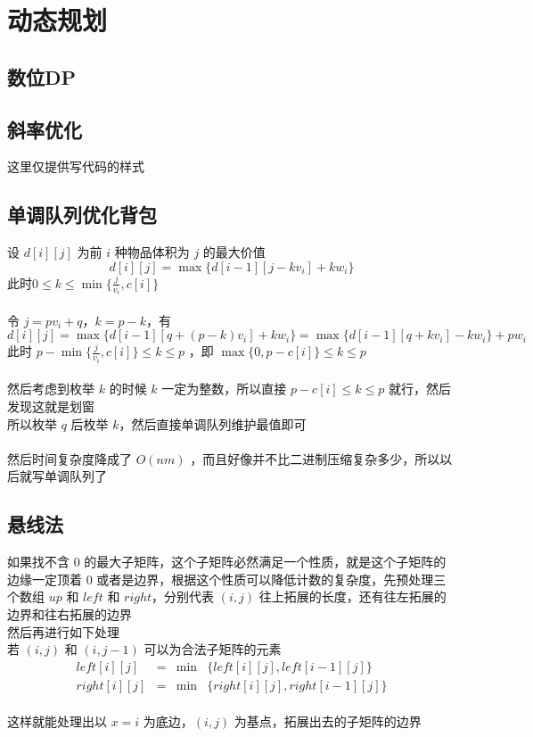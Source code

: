 %
%
	\newpage
	\section{动态规划}
	\subsection{数位DP}
	
	\newpage
	\subsection{斜率优化}
	这里仅提供写代码的样式
	\vspace{0.5cm}
	
	\newpage
	\subsection{单调队列优化背包}
	设 $d[i][j]$ 为前 $i$ 种物品体积为 $j$ 的最大价值\\
	$$
	d[i][j]=\max\{d[i-1][j-kv_i]+kw_i\}
	$$
	此时$0\leq k\leq \min\{\frac{j}{v_i},c[i]\}$\\
	\\
	令 $j=pv_i+q$，$k=p-k$，有\\
	$$
	d[i][j]=\max\{d[i-1][q+(p-k)v_i]+kw_i\}=\max\{d[i-1][q+kv_i]-kw_i\}+pw_i
	$$
	此时 $p-\min\{\frac{j}{v_i},c[i]\}\leq k\leq p$ ，即 $\max\{0,p-c[i]\}\leq k\leq p$\\
	\\
	然后考虑到枚举 $k$ 的时候 $k$ 一定为整数，所以直接 $p-c[i]\leq k\leq p $ 就行，然后发现这就是划窗\\
	所以枚举 $q$ 后枚举 $k$，然后直接单调队列维护最值即可\\
	\\
	然后时间复杂度降成了 $O(nm)$ ，而且好像并不比二进制压缩复杂多少，所以以后就写单调队列了\\
	
	\newpage
	\subsection{悬线法}
	如果找不含 $0$ 的最大子矩阵，这个子矩阵必然满足一个性质，就是这个子矩阵的边缘一定顶着 $0$ 或者是边界，根据这个性质可以降低计数的复杂度，先预处理三个数组 $up$ 和 $left$ 和 $right$，分别代表 $(i,j)$ 往上拓展的长度，还有往左拓展的边界和往右拓展的边界\\
	然后再进行如下处理\\
	若 $(i,j)$ 和 $(i,j-1)$ 可以为合法子矩阵的元素\\
	$$
	\begin{aligned}
	left[i][j]&=&\min&\{left[i][j],left[i-1][j]\}\\
	right[i][j]&=&\min&\{right[i][j],right[i-1][j]\}
	\end{aligned}
	$$\\
	这样就能处理出以 $x=i$ 为底边，$(i,j)$ 为基点，拓展出去的子矩阵的边界\\
	
	\newpage
